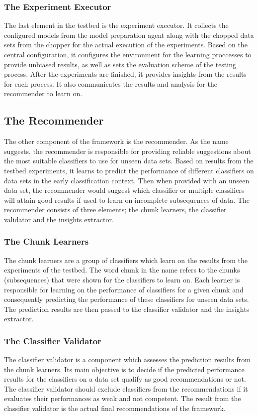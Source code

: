\subsubsection*{The Experiment Executor}
\label{ExperimentExecutor}
The last element in the testbed is the experiment executor.
It collects the configured models from the model preparation agent along with the chopped data sets from the chopper for the actual execution of the experiments.
Based on the central configuration, it configures the environment for the learning proccesses to provide unbiased results, as well as sets the evaluation scheme of the testing process.
After the experiments are finished, it provides insights from the results for each process.
It also communicates the results and analysis for the recommender to learn on.

\subsection{The Recommender}
\label{SubsectionRecommender}
The other component of the framework is the recommender.
As the name suggests, the recommender is responsible for providing reliable suggestions about the most suitable classifiers to use for unseen data sets.
Based on results from the testbed experiments, it learns to predict the performance of different classifiers on data sets in the early classification context.
Then when provided with an unseen data set, the recommender would suggest which classifier or multiple classifiers will attain good results if used to learn
on incomplete subsequences of data. The recommender consists of three elements; the chunk learners, the classifier validator and the insights extractor.

\subsubsection*{The Chunk Learners}
\label{ChunkLearners}
The chunk learners are a group of classifiers which learn on the results from the experiments of the testbed.
The word chunk in the name refers to the chunks (subsequences) that were shown for the classifiers to learn on.
Each learner is responsible for learning on the performance of classifiers for a given chunk and consequently predicting the performance of these classifiers for unseen data sets.
The prediction results are then passed to the classifier validator and the insights extractor.

\subsubsection*{The Classifier Validator}
\label{ClassifierValidator}
The classifier validator is a component which assesses the prediction results from the chunk learners.
Its main objective is to decide if the predicted performance results for the classifiers on a data set qualify as good recommendations or not.
The classifier validator should exclude classifiers from the recommendations if it evaluates their performances as weak and not competent.
The result from the classifier validator is the actual final recommendations of the framework.

